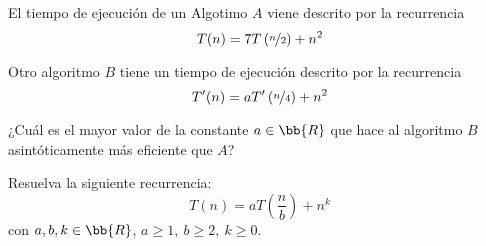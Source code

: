 \begin{ejercicio}
    El tiempo de ejecución de un Algotimo $A$ viene descrito por la recurrencia
    \begin{equation*}
        T(n)=7T\left(\nicefrac{n}{2}\right) + n^2
    \end{equation*}

    Otro algoritmo $B$ tiene un tiempo de ejecución descrito por la recurrencia
    \begin{equation*}
        T'(n)=aT'\left(\nicefrac{n}{4}\right) + n^2
    \end{equation*}

    ¿Cuál es el mayor valor de la constante $a\in \bb{R}$ que hace al algoritmo $B$ asintóticamente más eficiente que $A$?
\end{ejercicio}


\begin{ejercicio}
    Resuelva la siguiente recurrencia:
    \begin{equation*}
        T(n)=aT\left(\frac{n}{b}\right)+n^k
    \end{equation*}
    con $a,b,k\in \bb{R}$, $a\geq 1,~b\geq 2,~k\geq 0$.
\end{ejercicio}